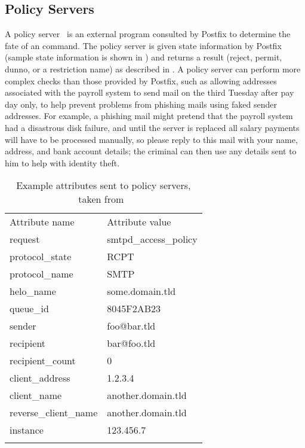 \subsection{Policy Servers}

\label{policy servers}

A policy server~\cite{policy-servers} is an external program consulted by
Postfix to determine the fate of an  command.  The policy
server is given state information by Postfix (sample state information is
shown in ) and returns
a result (reject, permit, dunno, or a restriction name) as described in
.  A policy server can
perform more complex checks than those provided by Postfix, such as
allowing addresses associated with the payroll system to send mail on the
third Tuesday after pay day only, to help prevent problems from phishing
mails using faked sender addresses.  For example, a phishing mail might
pretend that the payroll system had a disastrous disk failure, and until
the server is replaced all salary payments will have to be processed
manually, so please reply to this mail with your name, address, and bank
account details; the criminal can then use any details sent to him to help
with identity theft.

\begin{table}[thbp]
    \caption{Example attributes sent to policy servers, taken
    from~\cite{policy-servers}}
    \empty{}\label{Example attributes sent to policy servers}
    \centering{}
    \begin{tabular}[]{ll}
        \tabletopline{}%
        Attribute name          & Attribute value           \\
        \tablemiddleline{}%
        request                 & smtpd\_access\_policy     \\
        protocol\_state         & RCPT                      \\
        protocol\_name          & SMTP                      \\
        helo\_name              & some.domain.tld           \\
        queue\_id               & 8045F2AB23                \\
        sender                  & foo@bar.tld               \\
        recipient               & bar@foo.tld               \\
        recipient\_count        & 0                         \\
        client\_address         & 1.2.3.4                   \\
        client\_name            & another.domain.tld        \\
        reverse\_client\_name   & another.domain.tld        \\
        instance                & 123.456.7                 \\
        \tablebottomline{}%
    \end{tabular}
\end{table}


